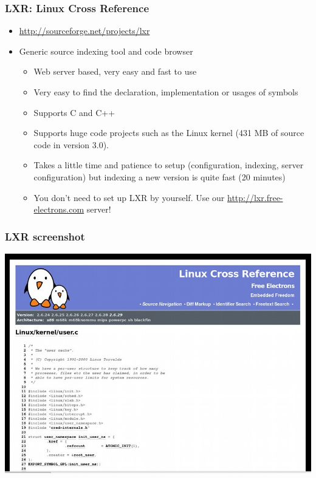 \begin{frame}
  \frametitle{LXR: Linux Cross Reference}
  \begin{itemize}
  \item \url{http://sourceforge.net/projects/lxr}
  \item Generic source indexing tool and code browser
    \begin{itemize}
    \item Web server based, very easy and fast to use
    \item Very easy to find the declaration, implementation or usages
      of symbols
    \item Supports C and C++
    \item Supports huge code projects such as the Linux kernel (431 MB
      of source code in version 3.0).
    \item Takes a little time and patience to setup (configuration,
      indexing, server configuration) but indexing a new version is
      quite fast (20 minutes)
    \item You don't need to set up LXR by yourself. Use our
      \url{http://lxr.free-electrons.com} server!
    \end{itemize}
  \end{itemize}
\end{frame}

\begin{frame}
  \frametitle{LXR screenshot}
  \begin{center}
    \includegraphics[width=\textwidth]{slides/kernel-source-code-management/lxr.png}
  \end{center}
\end{frame}

